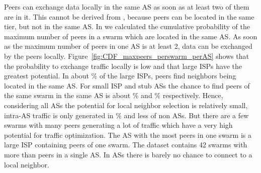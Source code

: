 

Peers can exchange data locally in the same AS as soon as at least two of them are in it. This cannot be derived from , because peers can be located in the same tier, but not in the same AS.
In  we calculated the cumulative probability of the maximum number of peers in a swarm which are located in the same AS. As soon as the maximum number of peers in one AS is at least 2, data can be exchanged by the peers locally. Figure~\ref{fig:CDF_maxpeers_perswarm_perAS} shows that the probability to exchange traffic locally is low and that large ISPs have the greatest potential. In about \unit[15]{\%} of the large ISPs, peers find neighbors being located in the same AS. For small ISP and stub ASs the chance to find peers of the same swarm in the same AS is about \unit[10]{\%} and \unit[12]{\%} respectively. Hence, considering all ASs the potential for local neighbor selection is relatively small, intra-AS traffic is only generated in \unit[15]{\%} and less of non \tier ASs. But there are a few swarms with many peers generating a lot of traffic which have a very high potential for traffic optimization. The AS with the most peers in one swarm is a large ISP containing  peers of one swarm. The dataset contains 42 swarms with more than  peers in a single AS.
In \tier ASs there is barely no chance to connect to a local neighbor.

